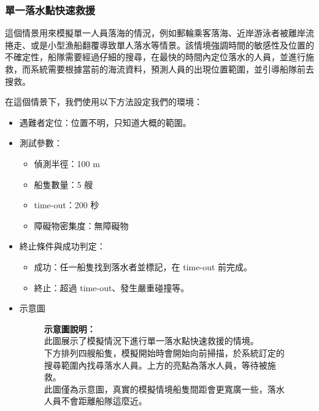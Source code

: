 \documentclass[12pt,a4paper]{article}
\begin{document}
\subsubsection{單一落水點快速救援}
這個情景用來模擬單一人員落海的情況，例如郵輪乘客落海、近岸游泳者被離岸流捲走、或是小型漁船翻覆導致單人落水等情景。該情境強調時間的敏感性及位置的不確定性，船隊需要經過仔細的搜尋，在最快的時間內定位落水的人員，並進行施救，而系統需要根據當前的海流資料，預測人員的出現位置範圍，並引導船隊前去搜救。
\\ \par
在這個情景下，我們使用以下方法設定我們的環境：
\begin{itemize}
    \item 遇難者定位：位置不明，只知道大概的範圍。
    \item 測試參數：
    \begin{itemize}
        \item 偵測半徑：100 m
        \item 船隻數量：5 艘
        \item time-out：200 秒
        \item 障礙物密集度：無障礙物
    \end{itemize}
    \item 終止條件與成功判定：
    \begin{itemize}
        \item 成功：任一船隻找到落水者並標記，在 time-out 前完成。
        \item 終止：超過 time-out、發生嚴重碰撞等。
    \end{itemize}
    \item 示意圖
	\begin{figure}[h]
	    \centering
	    \begin{minipage}[t]{0.55\textwidth}
	        \vspace{1cm} 
	        \textbf{示意圖說明：}\\
	        此圖展示了模擬情況下進行單一落水點快速救援的情境。\\
	        下方排列四艘船隻，模擬開始時會開始向前掃描，於系統訂定的搜尋範圍內找尋落水人員。上方的亮點為落水人員，等待被施救。\\
		此圖僅為示意圖，真實的模擬情境船隻間距會更寬廣一些，落水人員不會距離船隊這麼近。
	    \end{minipage}
	    \hfill
	    \begin{minipage}[t]{0.4\textwidth}
	        \vspace{0pt}
	        \centering

\end{minipage}
\end{figure}
\end{itemize}
\end{document}
